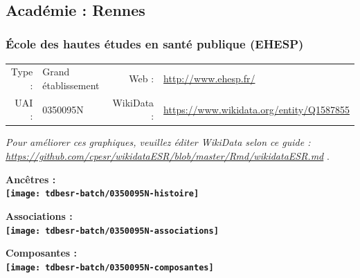 \documentclass[12pt,french,]{article}
\begin{document}
\ifoddpage \fi ~\newpage  

\hypertarget{acaduxe9mie-rennes-1}{%
\subsection{Académie : Rennes}\label{acaduxe9mie-rennes-1}}

\hypertarget{uxe9cole-des-hautes-uxe9tudes-en-santuxe9-publique-ehesp}{%
\subsubsection{École des hautes études en santé publique
(EHESP)}\label{uxe9cole-des-hautes-uxe9tudes-en-santuxe9-publique-ehesp}}

\begin{tabular*}{\textwidth}{rp{5cm}rl}  
\hline  
Type : & Grand établissement & Web : &\href{http://www.ehesp.fr/}{http://www.ehesp.fr/} \\  
UAI : & 0350095N & WikiData : & \href{https://www.wikidata.org/entity/Q1587855}{https://www.wikidata.org/entity/Q1587855} \\  
\hline  
\end{tabular*}

\textit{\scriptsize Pour améliorer ces graphiques, veuillez éditer WikiData selon ce guide :  \href{https://github.com/cpesr/wikidataESR/blob/master/Rmd/wikidataESR.md}{https://github.com/cpesr/wikidataESR/blob/master/Rmd/wikidataESR.md}}
.

\vspace{1cm}  
\begin{minipage}[b]{0.50\textwidth}\begin{center} \bf Ancêtres : \\  
\texttt{[image: tdbesr-batch/0350095N-histoire]} \end{center}\end{minipage}\begin{minipage}[b]{0.50\textwidth}\begin{center} \bf Associations : \\  
\texttt{[image: tdbesr-batch/0350095N-associations]} \end{center}\end{minipage}

\hrulefill

\begin{center} \bf Composantes : \\  
\texttt{[image: tdbesr-batch/0350095N-composantes]} \end{center}
\end{document}
